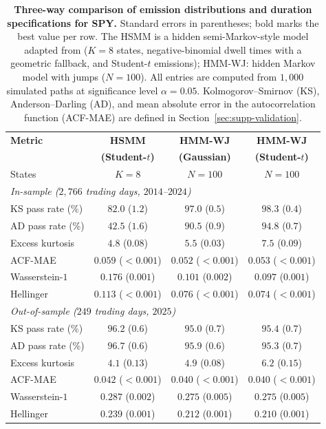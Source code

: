 \begin{table}[tbp]
\centering
\caption{\textbf{Three-way comparison of emission distributions and
    duration specifications for SPY.} Standard
    errors in parentheses; bold marks the best value per row. The HSMM
    is a hidden semi-Markov-style model adapted from \citet{bullaBulla2006}
    ($K = 8$ states, negative-binomial dwell times with a geometric
    fallback, and Student-$t$ emissions); HMM-WJ:
    hidden Markov model with jumps
    ($N = 100$). All entries are computed from $1{,}000$ simulated
    paths at significance level $\alpha = 0.05$. Kolmogorov--Smirnov
    (KS), Anderson--Darling (AD), and mean absolute error in the
    autocorrelation function (ACF-MAE) are defined in
    Section~\ref{sec:supp-validation}.}
\label{tab:emission_hsmm}
\small
\begin{tabular}{@{}lccc@{}}
\toprule
\textbf{Metric} & \textbf{HSMM} & \textbf{HMM-WJ} & \textbf{HMM-WJ} \\
                & \textbf{(Student-$t$)} & \textbf{(Gaussian)} & \textbf{(Student-$t$)} \\ \midrule
States              & $K = 8$ & $N = 100$ & $N = 100$ \\[4pt]
\multicolumn{4}{l}{\textit{In-sample ($2{,}766$ trading days, $2014$--$2024$)}} \\[2pt]
KS pass rate (\%)   &  $82.0$ ($1.2$)         &  $97.0$ ($0.5$)         & $\mathbf{98.3}$ ($0.4$) \\
AD pass rate (\%)   &  $42.5$ ($1.6$)         &  $90.5$ ($0.9$)         & $\mathbf{94.8}$ ($0.7$) \\
Excess kurtosis     &   $4.8$ ($0.08$)        &   $5.5$ ($0.03$)        & $\mathbf{7.5}$ ($0.09$) \\
ACF-MAE             & $0.059$ ($<\!0.001$)    & $\mathbf{0.052}$ ($<\!0.001$) & $0.053$ ($<\!0.001$) \\
Wasserstein-$1$     & $0.176$ ($0.001$)       & $0.101$ ($0.002$)       & $\mathbf{0.097}$ ($0.001$) \\
Hellinger           & $0.113$ ($<\!0.001$)    & $0.076$ ($<\!0.001$)   & $\mathbf{0.074}$ ($<\!0.001$) \\[4pt]
\multicolumn{4}{l}{\textit{Out-of-sample ($249$ trading days, $2025$)}} \\[2pt]
KS pass rate (\%)   & $\mathbf{96.2}$ ($0.6$) &  $95.0$ ($0.7$)         &  $95.4$ ($0.7$) \\
AD pass rate (\%)   & $\mathbf{96.7}$ ($0.6$) &  $95.9$ ($0.6$)         &  $95.3$ ($0.7$) \\
Excess kurtosis     &   $4.1$ ($0.13$)        &   $4.9$ ($0.08$)        & $\mathbf{6.2}$ ($0.15$) \\
ACF-MAE             & $0.042$ ($<\!0.001$)    & $\mathbf{0.040}$ ($<\!0.001$) & $\mathbf{0.040}$ ($<\!0.001$) \\
Wasserstein-$1$     & $0.287$ ($0.002$)       & $\mathbf{0.275}$ ($0.005$) & $\mathbf{0.275}$ ($0.005$) \\
Hellinger           & $0.239$ ($0.001$)       & $0.212$ ($0.001$)       & $\mathbf{0.210}$ ($0.001$) \\
\bottomrule
\end{tabular}
\end{table}

